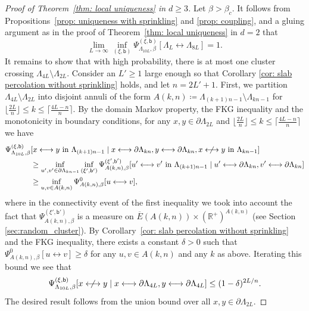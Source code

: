 \documentclass[11pt,a4paper]{article}
\theoremstyle{definition}
\numberwithin{equation}{section}
\begin{document}
\begin{proof}[Proof of Theorem~\textup{\ref{thm: local uniqueness}} in $d\geq 3$]
Let $\beta>\beta_c$. It follows from Propositions~\ref{prop: uniqueness with sprinkling} and \ref{prop: coupling}, and a gluing argument as in the proof of Theorem~\textup{\ref{thm: local uniqueness}} in $d=2$ that 
\begin{equation}
\lim_{L\to\infty}\inf_{(\xi,\mathsf{b})}\Psi^{(\xi,\mathsf{b})}_{\Lambda_{10L},\beta}[\Lambda_L \longleftrightarrow \Lambda_{8L}]= 1.
\end{equation}
It remains to show that with high probability, there is at most one cluster crossing $\Lambda_{4L}\setminus \Lambda_{2L}$. Consider an $L'\geq 1$ large enough so that Corollary \ref{cor: slab percolation without sprinkling} holds, and let $n=2L'+1$. 
First, we partition $\Lambda_{4L}\setminus \Lambda_{2L}$ into disjoint annuli of the form $A(k,n)\coloneqq\Lambda_{(k+1)n-1}\setminus\Lambda_{kn-1}$ for $\lfloor\frac{2L}{n}\rfloor\leq k\leq \lceil\frac{4L-n}{n}\rceil$. By the domain Markov property, the FKG inequality and the monotonicity in boundary conditions, for any $x,y\in \partial \Lambda_{2L}$ and  $\lfloor\frac{2L}{n}\rfloor\leq k\leq \lceil\frac{4L-n}{n}\rceil$ we have
\begin{align*}
\Psi^{(\xi,\mathsf{b})}_{\Lambda_{10L},\beta}&[x\longleftrightarrow y \text{ in } \Lambda_{(k+1)n-1} \mid x\longleftrightarrow \partial \Lambda_{kn}, y \longleftrightarrow \partial \Lambda_{kn},x\centernot\longleftrightarrow y \text{ in } \Lambda_{kn-1}]
\\ &\geq \inf_{u',v'\in \partial \Lambda_{kn-1}}\inf_{(\xi',\mathsf{b}')}\Psi^{(\xi',\mathsf{b}')}_{A(k,n),\beta}[u'\longleftrightarrow v' \text{ in } \Lambda_{(k+1)n-1} \mid u'\longleftrightarrow \partial \Lambda_{kn}, v' \longleftrightarrow \partial \Lambda_{kn}]
\\ &\geq 
\inf_{u,v\in A(k,n)} \Psi^{0}_{A(k,n),\beta}[u\longleftrightarrow v],  
\end{align*}
where in the connectivity event of the first inequality we took into account the fact that $\Psi^{(\xi',\mathsf{b}')}_{A(k,n),\beta}$ is a measure on $\overline{E}(A(k,n))\times (\mathbb R^+)^{A(k,n)}$ (see Section \ref{sec:random_cluster}).
By Corollary~\ref{cor: slab percolation without sprinkling} and the FKG inequality, there exists a constant $\delta>0$ such that $\Psi^{0}_{A(k,n),\beta}[u\longleftrightarrow v]\geq \delta$ for any $u,v\in A(k,n)$ and any $k$ as above. Iterating this bound we see that
\begin{equation}
\Psi^{(\xi,\mathsf{b})}_{\Lambda_{10L},\beta}[x\centernot\longleftrightarrow y \mid x\longleftrightarrow \partial \Lambda_{4L}, y \longleftrightarrow \partial \Lambda_{4L}]\leq (1-\delta)^{2L/n}.  
\end{equation}
The desired result follows from the union bound over all $x,y\in \partial \Lambda_{2L}$. 
\end{proof}
\end{document}
